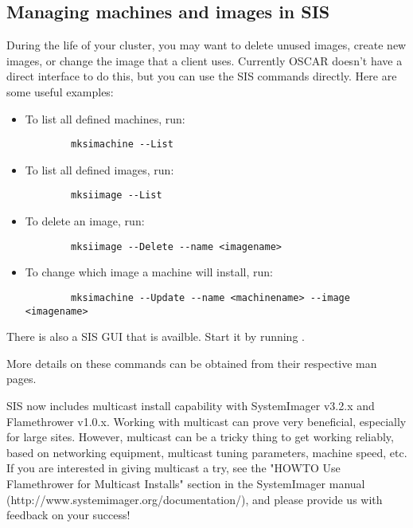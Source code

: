 %
%
%

\subsection{Managing machines and images in SIS}
\label{app:troubleshooting-machines-images}

During the life of your cluster, you may want to delete unused
images, create new images, or change the image that a
client uses.  Currently OSCAR doesn't have a direct interface to do
this, but you can use the SIS commands directly. Here are some useful
examples:

\begin{itemize}
\item To list all defined machines, run:
\begin{verbatim}
        mksimachine --List
\end{verbatim}
\item To list all defined images, run:
\begin{verbatim}
        mksiimage --List
\end{verbatim}
\item To delete an image, run:
\begin{verbatim}
        mksiimage --Delete --name <imagename>
\end{verbatim}
\item To change which image a machine will install, run:
\begin{verbatim}
        mksimachine --Update --name <machinename> --image <imagename>
\end{verbatim}
\end{itemize}

There is also a SIS GUI that is availble. Start it by running
. 

More details on these commands can be obtained from their respective
man pages.

SIS now includes multicast install capability with SystemImager v3.2.x
and Flamethrower v1.0.x.  Working with multicast can prove very
beneficial, especially for large sites.  However, multicast can be a
tricky thing to get working reliably, based on networking equipment,
multicast tuning parameters, machine speed, etc.  If you are interested
in giving multicast a try, see the "HOWTO Use Flamethrower for Multicast
Installs" section in the SystemImager manual (http://www.systemimager.org/documentation/), and please provide us with feedback on your success!


